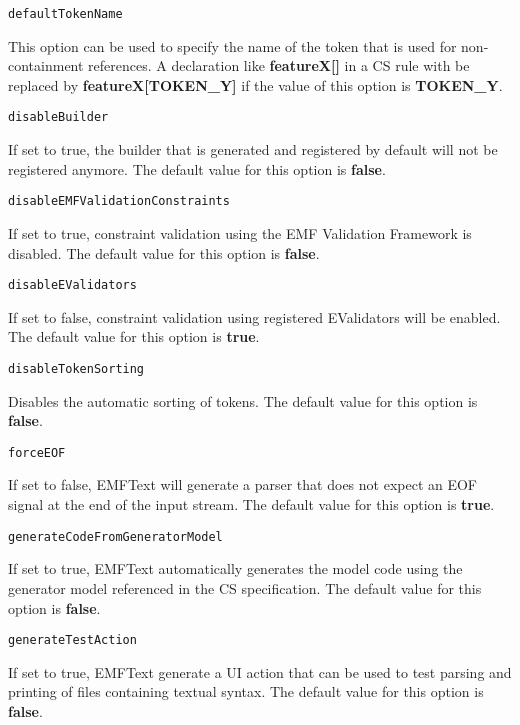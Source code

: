 \noindent\texttt{defaultTokenName}
\begin{myindentpar}{1cm}
This option can be used to specify the name of the token that is used for non-containment references. A declaration like \textbf{featureX[]} in a CS rule with be replaced by \textbf{featureX[TOKEN_Y]} if the value of this option is \textbf{TOKEN_Y}.
\end{myindentpar}

\noindent\texttt{disableBuilder}
\begin{myindentpar}{1cm}
If set to true, the builder that is generated and registered by default will not be registered anymore. The default value for this option is \textbf{false}.
\end{myindentpar}

\noindent\texttt{disableEMFValidationConstraints}
\begin{myindentpar}{1cm}
If set to true, constraint validation using the EMF Validation Framework is disabled. The default value for this option is \textbf{false}.
\end{myindentpar}

\noindent\texttt{disableEValidators}
\begin{myindentpar}{1cm}
If set to false, constraint validation using registered EValidators will be enabled. The default value for this option is \textbf{true}.
\end{myindentpar}

\noindent\texttt{disableTokenSorting}
\begin{myindentpar}{1cm}
Disables the automatic sorting of tokens. The default value for this option is \textbf{false}.
\end{myindentpar}

\noindent\texttt{forceEOF}
\begin{myindentpar}{1cm}
If set to false, EMFText will generate a parser that does not expect an EOF signal at the end of the input stream. The default value for this option is \textbf{true}.
\end{myindentpar}

\noindent\texttt{generateCodeFromGeneratorModel}
\begin{myindentpar}{1cm}
If set to true, EMFText automatically generates the model code using the generator model referenced in the CS specification. The default value for this option is \textbf{false}.
\end{myindentpar}

\noindent\texttt{generateTestAction}
\begin{myindentpar}{1cm}
If set to true, EMFText generate a UI action that can be used to test parsing and printing of files containing textual syntax. The default value for this option is \textbf{false}.
\end{myindentpar}

